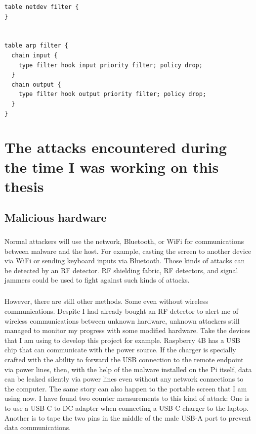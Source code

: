 \documentclass[mscthesis]{usiinfthesis}
\begin{document}
\begin{lstlisting}[language={},frame=single,breaklines=true,postbreak=\mbox{\textcolor{red}{$\hookrightarrow$}\space}]
table netdev filter {
}


table arp filter {
  chain input {
    type filter hook input priority filter; policy drop;
  }
  chain output {
    type filter hook output priority filter; policy drop;
  }
}
\end{lstlisting}

\chapter{The attacks encountered during the time I was working on this thesis}

\section{Malicious hardware}
\paragraph{}
Normal attackers will use the network, Bluetooth, or WiFi for communications between malware and the host. For example, casting the screen to another device via WiFi or sending keyboard inputs via Bluetooth. Those kinds of attacks can be detected by an RF detector. RF shielding fabric, RF detectors, and signal jammers could be used to fight against such kinds of attacks.
\paragraph{}
However, there are still other methods. Some even without wireless communications. Despite I had already bought an RF detector to alert me of wireless communications between unknown hardware, unknown attackers still managed to monitor my progress with some modified hardware. Take the devices that I am using to develop this project for example. Raspberry 4B has a USB chip that can communicate with the power source. If the charger is specially crafted with the ability to forward the USB connection to the remote endpoint via power lines, then, with the help of the malware installed on the Pi itself, data can be leaked silently via power lines even without any network connections to the computer. The same story can also happen to the portable screen that I am using now. I have found two counter measurements to this kind of attack: One is to use a USB-C to DC adapter when connecting a USB-C charger to the laptop. Another is to tape the two pins in the middle of the male USB-A port to prevent data communications.
\end{document}
